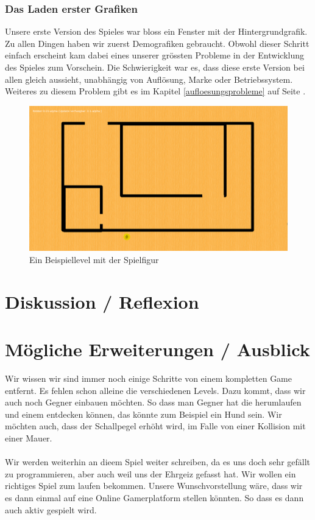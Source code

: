 \documentclass[11pt,a4paper]{scrbook}
\begin{document}
\subsection{Das Laden erster Grafiken}
Unsere erste Version des Spieles war bloss ein Fenster mit der Hintergrundgrafik.
Zu allen Dingen haben wir zuerst Demografiken gebraucht.
Obwohl dieser Schritt einfach erscheint kam dabei eines unserer grössten Probleme in der Entwicklung des Spieles zum Vorschein.
Die Schwierigkeit war es, dass diese erste Version bei allen gleich aussieht, unabhängig von Auflösung, Marke oder Betriebssystem.
Weiteres zu diesem Problem gibt es im Kapitel \ref{aufloesungsprobleme} auf Seite \pageref{aufloesungsprobleme}.\\
\begin{figure}[h!]
\centering
\includegraphics[scale=0.12]{img/grafiken.png}
\caption{Ein Beispiellevel mit der Spielfigur}
\end{figure}


\chapter{Diskussion / Reflexion}


\chapter{Mögliche Erweiterungen / Ausblick}
Wir wissen wir sind immer noch einige Schritte von einem kompletten Game entfernt. Es fehlen schon alleine die verschiedenen Levels. Dazu kommt, dass wir auch noch Gegner einbauen möchten. So dass man Gegner hat die herumlaufen und einem entdecken können, das könnte zum Beispiel ein Hund sein. Wir möchten auch, dass der Schallpegel erhöht wird, im Falle von einer Kollision mit einer Mauer. 	
\\ 	
\\ 	
Wir werden weiterhin an dieem Spiel weiter schreiben, da es uns doch sehr gefällt zu programmieren, aber auch weil uns der Ehrgeiz gefasst hat. Wir wollen ein richtiges Spiel zum laufen bekommen. Unsere Wunschvorstellung wäre, dass wir es dann einmal auf eine Online Gamerplatform stellen könnten. So dass es dann auch aktiv gespielt wird. 
\end{document}
